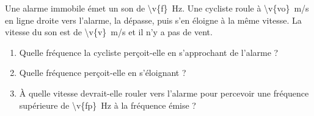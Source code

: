 Une alarme immobile émet un son de \qty{\v{f}}{Hz}. Une cycliste roule à \qty{\v{vo}}{m/s} en ligne droite vers l'alarme, la dépasse, puis s'en éloigne à la même vitesse. La vitesse du son est de \qty{\v{v}}{m/s} et il n'y a pas de vent.

\begin{enumerate}[label=\alph*)]
    \item Quelle fréquence la cycliste perçoit-elle en s'approchant de l'alarme ?
    \item Quelle fréquence perçoit-elle en s'éloignant ?
    \item À quelle vitesse devrait-elle rouler vers l'alarme pour percevoir une fréquence supérieure de \qty{\v{fp}}{Hz} à la fréquence émise ?
\end{enumerate}
